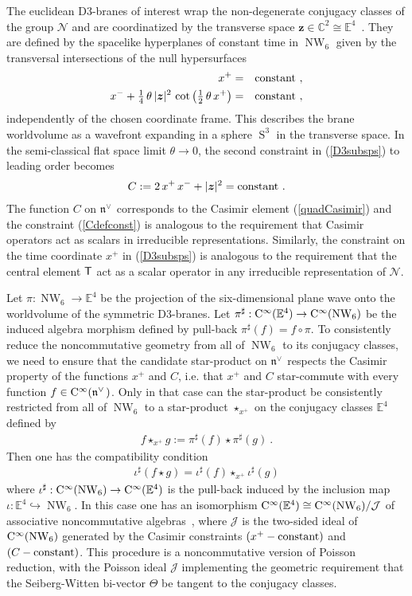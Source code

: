 \documentclass[11pt,a4paper]{article}
\DeclareMathOperator{\Sphere}{S}
\DeclareMathOperator{\NW}{NW}
\def\nn{\nonumber}
\newcommand{\1}{\mathbb{1}}
\newcommand{\mbf}[1]{{\boldsymbol {#1} }}
\def\CC{{\rm C}}
\def\T{{\sf T}}
\def\mz{{\mbf z}}
\def\mfn{{\mathfrak n}}
\newcommand{\complex}{{\mathbb C}} %
\newcommand{\eucl}{{\mathbb E}}
\def\nn{\nonumber}
\def\bea{\begin{eqnarray}}
\newcommand{\beq}{\begin{eqnarray}}
\newcommand{\eeq}{\end{eqnarray}}
\begin{document}
The euclidean D3-branes of interest wrap the non-degenerate conjugacy
classes of the group $\mathcal{N}$ and are coordinatized by the
transverse space $\mz\in\complex^2\cong\eucl^4$~\cite{SF-OF1}. They
are defined by the spacelike hyperplanes of constant time in $\NW_6$
given by the transversal intersections of the null hypersurfaces
\bea
x^+&=&{\rm constant} \ , \nn\\
x^-+\mbox{$\frac14$}\,\theta\,|\mz|^2\,\cot\left(\mbox{$\frac12$}\,
\theta\,x^+\right)&=&{\rm constant} \ ,
\label{D3subsps}\eeq
independently of the chosen coordinate frame. This describes the brane
worldvolume as a wavefront expanding in a sphere $\Sphere^3$ in the
transverse space. In the semi-classical flat space limit $\theta\to0$,
the second constraint in (\ref{D3subsps}) to leading order becomes
\beq
C:=2\,x^+\,x^-+|\mz|^2={\rm constant} \ .
\label{Cdefconst}\eeq
The function $C$ on $\mfn^{\vee\,}$ corresponds to the Casimir element
(\ref{quadCasimir}) and the constraint (\ref{Cdefconst}) is analogous
to the requirement that Casimir operators act as scalars in irreducible
representations. Similarly, the constraint on the time coordinate
$x^+$ in (\ref{D3subsps}) is analogous to the requirement that the
central element $\T$ act as a scalar operator in any irreducible
representation of $\mathcal{N}$.

Let $\pi:\NW_6\to\eucl^4$ be the projection of the six-dimensional
plane wave onto the worldvolume of the symmetric D3-branes. Let
$\pi^\sharp:\CC^\infty(\eucl^4)\to\CC^\infty(\NW_6)$ be the induced algebra
morphism defined by pull-back $\pi^\sharp(f)=f\circ\pi$. To consistently
reduce the noncommutative geometry from all of $\NW_6$
to its conjugacy classes, we need to ensure that the candidate
star-product on $\mfn^{\vee\,}$ respects the Casimir property of the
functions $x^+$ and $C$, i.e. that $x^+$ and $C$ star-commute with
every function $f\in\CC^\infty(\mfn^{\vee\,})$. Only in that case can the
star-product be consistently restricted from all of $\NW_6$ to a
star-product $\star_{x^+}$ on the conjugacy classes $\eucl^4$ defined
by
\beq
f\star_{x^+}g:=\pi^\sharp(f)\star\pi^\sharp(g) \ .
\label{starxpdef}\eeq
Then one has the compatibility condition
\beq
\iota^\sharp(f\star g)=\iota^\sharp(f)\star_{x^+}\iota^\sharp(g)
\label{compcondWeyl}\eeq
where $\iota^\sharp:\CC^\infty(\NW_6)\to\CC^\infty(\eucl^4)$ is the
pull-back induced by the inclusion map
$\iota:\eucl^4\hookrightarrow\NW_6$. In this case one has an isomorphism
$\CC^\infty(\eucl^4)\cong\CC^\infty(\NW_6)/\mathcal{J}$ of associative
noncommutative algebras~\cite{Waldmann1}, where $\mathcal{J}$ is the
two-sided ideal of $\CC^\infty(\NW_6)$ generated by the Casimir
constraints $(x^+-{\rm constant})$ and $(C-{\rm constant})$. This
procedure is a noncommutative version of Poisson reduction, with the
Poisson ideal $\mathcal{J}$ implementing the geometric requirement
that the Seiberg-Witten bi-vector $\Theta$ be tangent to the conjugacy
classes.
\end{document}
